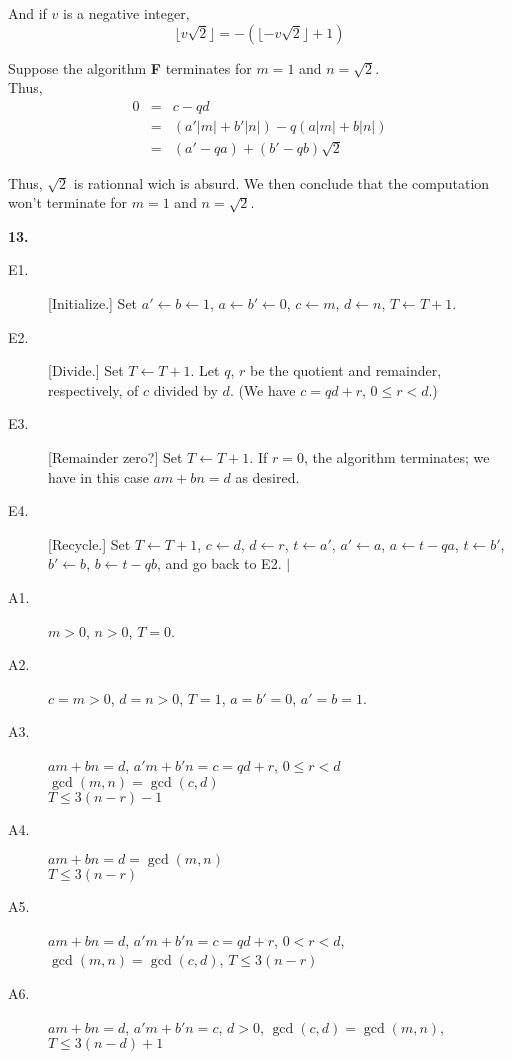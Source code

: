 \documentclass[a4paper,12pt]{article}
\begin{document}
And if $v$ is a negative integer,
\[ \lfloor v \sqrt{2} \rfloor = - \left(\lfloor -v\sqrt{2}\rfloor + 1\right) \]

Suppose the algorithm \textbf{F} terminates for $m = 1$ and $n = \sqrt{2}$.\\
Thus,
\begin{eqnarray*}
0 & = & c - qd \\
& = & (a'|m| + b'|n|) - q(a|m|+b|n|)\\
& = & (a'-qa) + (b'-qb)\sqrt{2}
\end{eqnarray*}

Thus, $\sqrt{2}$ is rationnal wich is absurd. We then conclude that the
computation won't terminate for $m = 1$ and $n = \sqrt{2}$.

\bigskip
\noindent
\textbf{13.}
\begin{description}
\item[E1.]
[Initialize.] Set $a' \leftarrow b \leftarrow 1$, $a \leftarrow b' \leftarrow 0
$, $c \leftarrow m$, $d \leftarrow n$, $T \leftarrow T+1$.
\item[E2.]
[Divide.] Set $T \leftarrow T+1$. Let $q$, $r$ be the quotient and remainder,
respectively, of $c$ divided by $d$. (We have $c=qd+r$, $0 \le r < d$.)
\item[E3.]
[Remainder zero?] Set $T \leftarrow T+1$. If $r=0$, the algorithm terminates;
we have in this case $am + bn = d$ as desired.
\item[E4.]
[Recycle.] Set $T \leftarrow T+1$, $c \leftarrow d$, $d \leftarrow r$,
$t \leftarrow a'$, $a' \leftarrow a$, $a \leftarrow t - qa$, $t \leftarrow b'$,
$b' \leftarrow b$, $b \leftarrow t - qb$, and go back to E2. $|$
\end{description}

\begin{description}
\item[A1.]
$m > 0$, $n > 0$, $T = 0$.
\item[A2.]
$c = m > 0$, $d = n > 0$, $T = 1$, $a = b' = 0$, $a' = b = 1$.
\item[A3.]
$am + bn = d$, $a'm + b'n = c = qd + r$, $0 \le r < d$\\
$\gcd(m, n) = \gcd(c, d)$\\
$T \le 3(n-r)-1$
\item[A4.]
$am + bn = d = \gcd(m, n)$\\
$T \le 3(n-r)$
\item[A5.]
$am + bn = d$, $a'm + b'n = c = qd + r$, $0 < r < d$, $\gcd(m,n) = \gcd(c, d)$,
$T \le 3(n-r)$
\item[A6.]
$am+bn=d$, $a'm + b'n = c$, $d > 0$, $\gcd(c,d) = \gcd(m,n)$, $T \le 3(n-d)+1$
\end{description}
\end{document}
